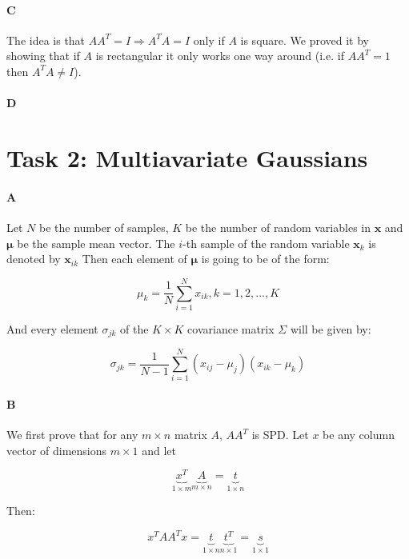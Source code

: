 \documentclass[12pt]{article}
\begin{document}
\paragraph{C}
The idea is that $AA^T = I \Rightarrow A^TA=I$ only if $A$ is square. We proved it by showing that if $A$ is rectangular it only works one way around (i.e. if $AA^T=1$ then $A^TA \neq I$).

\paragraph{D}

\section{Task 2: Multiavariate Gaussians}

\paragraph{A}
Let $N$ be the number of samples, $K$ be the number of random variables in $\mathbf{x}$ and $\mathbf{\mu}$ be the sample mean vector. The $i$-th sample of the random variable $\mathbf{x}_k$ is denoted by $\mathbf{x}_{ik}$ Then each element of $\mathbf{\mu}$ is going to be of the form:

\begin{equation}
\mu_k = \frac{1}{N}\displaystyle\sum_{i=1}^{N}{x_{ik}}, k=1,2,...,K
\end{equation}

And every element $\sigma_{jk}$ of the $K \times K$ covariance matrix $\Sigma$ will be given by:

\begin{equation}
\sigma_{jk}=\frac{1}{N-1}\displaystyle\sum_{i=1}^{N}{(x_{ij}-\mu_j)(x_{ik}-\mu_{k})}
\end{equation}

\paragraph{B}

We first prove that for any $m \times n$ matrix $A$, $AA^T$ is SPD. Let $x$ be any column vector of dimensions $m\times1$ and let

\[
\underbrace{x^T}_{1\times m}\underbrace{A}_{m\times n}=\underbrace{t}_{1\times n}
\]

Then:

\[
x^TAA^Tx = \underbrace{t}_{1\times n}\underbrace{t^T}_{n \times 1} = \underbrace{s}_{1\times 1}
\]
\end{document}
